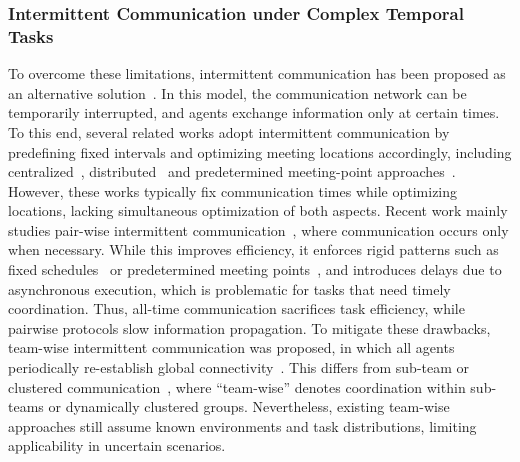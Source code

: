 \subsubsection{Intermittent Communication under Complex Temporal Tasks}
To overcome these limitations, intermittent communication has been proposed as an alternative
solution~\cite{aragues2020intermittent, guo2018multirobot, kantaros2019temporal}. In this model, the communication network can be
temporarily interrupted, and agents exchange information only at certain times.
To this end, several related works adopt intermittent communication
by predefining fixed intervals and optimizing meeting locations accordingly,
including centralized~\cite{wang2023multi}, distributed~\cite{kantaros2016distributed}
and predetermined meeting-point approaches~\cite{da2024communication}.
However, these works typically fix communication times while optimizing locations,
lacking simultaneous optimization of both aspects.
Recent work mainly studies pair-wise intermittent communication~\cite{aragues2020intermittent,
guo2018multirobot, kantaros2019temporal}, where communication occurs only when necessary. {While
this improves efficiency, it enforces rigid patterns such as fixed schedules~\cite{aragues2020intermittent,
kantaros2019temporal} or predetermined meeting points~\cite{guo2018multirobot}, and introduces
delays due to asynchronous execution, which is problematic for tasks that need timely coordination}. Thus,
all-time communication sacrifices task efficiency, while pairwise protocols slow
information propagation. To mitigate these drawbacks, team-wise intermittent communication was proposed,
in which all agents periodically re-establish global connectivity~\cite{saboia2022achord}.
This differs from sub-team or clustered communication~\cite{ren2023matcpf, yang2024teamwise},
where ``team-wise'' denotes coordination within sub-teams or dynamically clustered groups.
Nevertheless, existing team-wise approaches still assume known environments
and task distributions, limiting applicability in uncertain scenarios.



